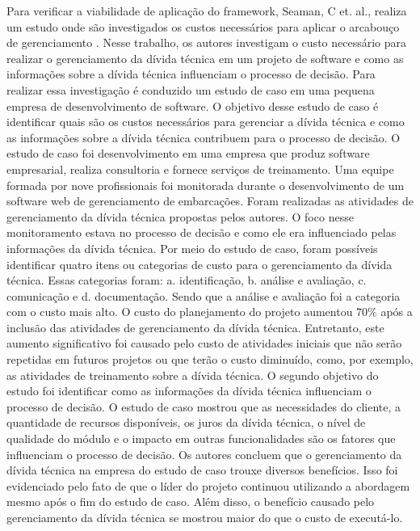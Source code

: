 Para verificar a viabilidade de aplicação do framework, Seaman, C et. al., realiza um estudo onde são investigados os custos necessários para aplicar o arcabouço de gerenciamento
 \cite{guo2016exploring}. Nesse trabalho, os autores investigam o custo necessário para realizar o gerenciamento da dívida técnica em um projeto de software e como as informações sobre a dívida técnica influenciam o processo de decisão. Para realizar essa investigação é conduzido um estudo de caso em uma pequena empresa de desenvolvimento de software. O objetivo desse estudo de caso é identificar quais são os custos necessários para gerenciar a dívida técnica e como as informações sobre a dívida técnica contribuem para o processo de decisão.  O estudo de caso foi desenvolvimento em uma empresa que produz software empresarial, realiza consultoria e fornece serviços de treinamento. Uma equipe formada por nove profissionais foi monitorada durante o desenvolvimento de um software web de gerenciamento de embarcações. Foram realizadas as atividades de gerenciamento da dívida técnica propostas pelos autores. O foco nesse monitoramento estava no processo de decisão e como ele era influenciado pelas informações da dívida técnica. Por meio do estudo de caso, foram possíveis identificar quatro itens ou categorias de custo para o gerenciamento da dívida técnica. Essas categorias foram: a. identificação, b. análise e avaliação, c. comunicação e d. documentação. Sendo que a análise e avaliação foi a categoria com o custo mais alto. O custo do planejamento do projeto aumentou 70\% após a inclusão das atividades de gerenciamento da dívida técnica. Entretanto, este aumento significativo foi causado pelo custo de atividades iniciais que não serão repetidas em futuros projetos ou que terão o custo diminuído, como, por exemplo, as atividades de treinamento sobre a dívida técnica. O segundo objetivo do estudo foi identificar como as informações da dívida técnica influenciam o processo de decisão. O estudo de caso mostrou que as necessidades do cliente, a quantidade de recursos disponíveis, os juros da dívida técnica, o nível de qualidade do módulo e o impacto em outras funcionalidades são os fatores que influenciam o processo de decisão. Os autores concluem que o gerenciamento da dívida técnica na empresa do estudo de caso trouxe diversos benefícios. Isso foi evidenciado pelo fato de que o líder do projeto continuou utilizando a abordagem mesmo após o fim do estudo de caso. Além disso, o benefício causado pelo gerenciamento da dívida técnica se mostrou maior do que o custo de executá-lo. 

